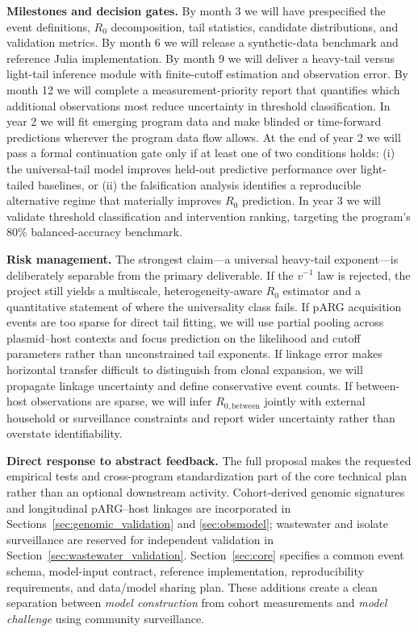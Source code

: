 \documentclass[12pt,a4paper]{article}
\newcommand{\Rbetween}{R_{0,\mathrm{between}}}
\begin{document}
\textbf{Milestones and decision gates.} By month 3 we will have prespecified the event definitions, $R_0$ decomposition, tail statistics, candidate distributions, and validation metrics. By month 6 we will release a synthetic-data benchmark and reference Julia implementation. By month 9 we will deliver a heavy-tail versus light-tail inference module with finite-cutoff estimation and observation error. By month 12 we will complete a measurement-priority report that quantifies which additional observations most reduce uncertainty in threshold classification. In year 2 we will fit emerging program data and make blinded or time-forward predictions wherever the program data flow allows. At the end of year 2 we will pass a formal continuation gate only if at least one of two conditions holds: (i) the universal-tail model improves held-out predictive performance over light-tailed baselines, or (ii) the falsification analysis identifies a reproducible alternative regime that materially improves $R_0$ prediction. In year 3 we will validate threshold classification and intervention ranking, targeting the program's 80\% balanced-accuracy benchmark.

\textbf{Risk management.} The strongest claim---a universal heavy-tail exponent---is deliberately separable from the primary deliverable. If the $v^{-1}$ law is rejected, the project still yields a multiscale, heterogeneity-aware $R_0$ estimator and a quantitative statement of where the universality class fails. If pARG acquisition events are too sparse for direct tail fitting, we will use partial pooling across plasmid--host contexts and focus prediction on the likelihood and cutoff parameters rather than unconstrained tail exponents. If linkage error makes horizontal transfer difficult to distinguish from clonal expansion, we will propagate linkage uncertainty and define conservative event counts. If between-host observations are sparse, we will infer $\Rbetween$ jointly with external household or surveillance constraints and report wider uncertainty rather than overstate identifiability.

\textbf{Direct response to abstract feedback.} The full proposal makes the requested empirical tests and cross-program standardization part of the core technical plan rather than an optional downstream activity. Cohort-derived genomic signatures and longitudinal pARG--host linkages are incorporated in Sections~\ref{sec:genomic_validation} and \ref{sec:obsmodel}; wastewater and isolate surveillance are reserved for independent validation in Section~\ref{sec:wastewater_validation}. Section~\ref{sec:core} specifies a common event schema, model-input contract, reference implementation, reproducibility requirements, and data/model sharing plan. These additions create a clean separation between \emph{model construction} from cohort measurements and \emph{model challenge} using community surveillance.
\end{document}
